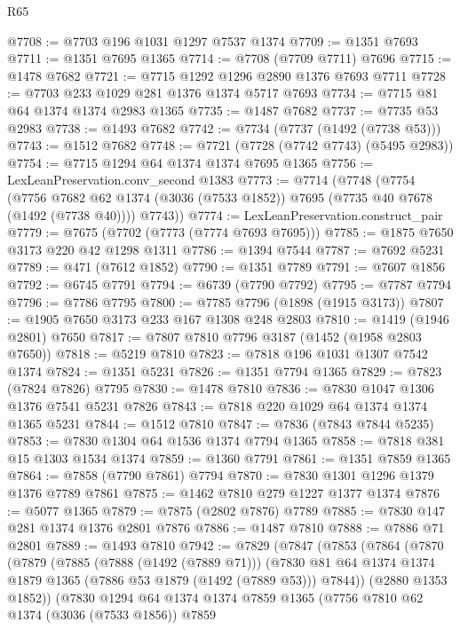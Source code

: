 \begin{lexlean}{R65}
\begin{coremodule}
@7708 := @7703 @196 @1031 @1297 @7537 @1374
@7709 := @1351 @7693
@7711 := @1351 @7695 @1365
@7714 := @7708 (@7709 @7711) @7696
@7715 := @1478 @7682
@7721 := @7715 @1292 @1296 @2890 @1376 @7693 @7711
@7728 := @7703 @233 @1029 @281 @1376 @1374 @5717 @7693
@7734 := @7715 @81 @64 @1374 @1374 @2983 @1365
@7735 := @1487 @7682
@7737 := @7735 @53 @2983
@7738 := @1493 @7682
@7742 := @7734 (@7737 (@1492 (@7738 @53)))
@7743 := @1512 @7682
@7748 := @7721 (@7728 (@7742 @7743) (@5495 @2983))
@7754 := @7715 @1294 @64 @1374 @1374 @7695 @1365
@7756 := LexLeanPreservation.conv_second @1383
@7773 := @7714
    (@7748
      (@7754
        (@7756 @7682 @62 @1374 (@3036 (@7533 @1852)) @7695 (@7735 @40 @7678 (@1492 (@7738 @40))))
        @7743))
@7774 := LexLeanPreservation.construct_pair
@7779 := @7675 (@7702 (@7773 (@7774 @7693 @7695)))
@7785 := @1875 @7650 @3173 @220 @42 @1298 @1311
@7786 := @1394 @7544
@7787 := @7692 @5231
@7789 := @471 (@7612 @1852)
@7790 := @1351 @7789
@7791 := @7607 @1856
@7792 := @6745 @7791
@7794 := @6739 (@7790 @7792)
@7795 := @7787 @7794
@7796 := @7786 @7795
@7800 := @7785 @7796 (@1898 (@1915 @3173))
@7807 := @1905 @7650 @3173 @233 @167 @1308 @248 @2803
@7810 := @1419 (@1946 @2801) @7650
@7817 := @7807 @7810 @7796 @3187 (@1452 (@1958 @2803 @7650))
@7818 := @5219 @7810
@7823 := @7818 @196 @1031 @1307 @7542 @1374
@7824 := @1351 @5231
@7826 := @1351 @7794 @1365
@7829 := @7823 (@7824 @7826) @7795
@7830 := @1478 @7810
@7836 := @7830 @1047 @1306 @1376 @7541 @5231 @7826
@7843 := @7818 @220 @1029 @64 @1374 @1374 @1365 @5231
@7844 := @1512 @7810
@7847 := @7836 (@7843 @7844 @5235)
@7853 := @7830 @1304 @64 @1536 @1374 @7794 @1365
@7858 := @7818 @381 @15 @1303 @1534 @1374
@7859 := @1360 @7791
@7861 := @1351 @7859 @1365
@7864 := @7858 (@7790 @7861) @7794
@7870 := @7830 @1301 @1296 @1379 @1376 @7789 @7861
@7875 := @1462 @7810 @279 @1227 @1377 @1374
@7876 := @5077 @1365
@7879 := @7875 (@2802 @7876) @7789
@7885 := @7830 @147 @281 @1374 @1376 @2801 @7876
@7886 := @1487 @7810
@7888 := @7886 @71 @2801
@7889 := @1493 @7810
@7942 := @7829
    (@7847
      (@7853
        (@7864
          (@7870
            (@7879
              (@7885
                (@7888 (@1492 (@7889 @71)))
                (@7830 @81 @64 @1374 @1374 @1879 @1365 (@7886 @53 @1879 (@1492 (@7889 @53))) @7844))
              (@2880 @1353 @1852))
            (@7830
              @1294
              @64
              @1374
              @1374
              @7859
              @1365
              (@7756
                @7810
                @62
                @1374
                (@3036 (@7533 @1856))
                @7859

\end{coremodule}
\end{lexlean}
